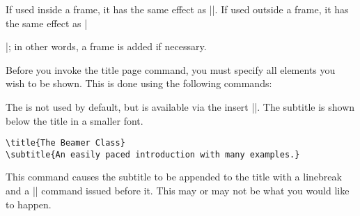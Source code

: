 \begin{command}{\maketitle}
  \beamernote
  If used inside a frame, it has the same effect as |\titlepage|. If used outside a frame, it has the same effect as |\begin{frame}\titlepage\end{frame}|; in other words, a frame is added if necessary.
\end{command}

Before you invoke the title page command, you must specify all elements you wish to be shown. This is done using the following commands:


\begin{command}{\subtitle{}}
  The  is not used by default, but is available via the insert |\insertshortsubtitle|. The subtitle is shown below the title in a smaller font.
  \example
\begin{verbatim}
\title{The Beamer Class}
\subtitle{An easily paced introduction with many examples.}
\end{verbatim}

  \articlenote
  This command causes the subtitle to be appended to the title with a linebreak and a |\normalsize| command issued before it. This may or may not be what you would like to happen.
\end{command}


